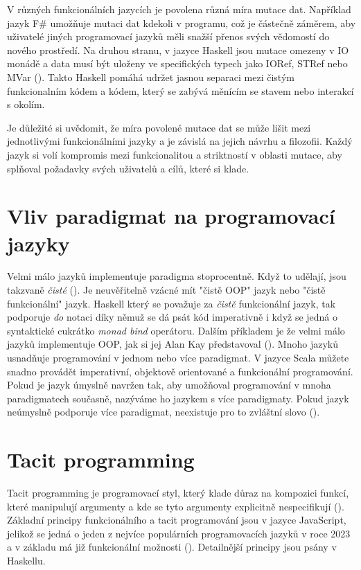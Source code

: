 \documentclass[male,czech]{kithesis}
\begin{document}
V různých funkcionálních jazycích je povolena různá míra mutace dat.
Například jazyk F\# umožňuje mutaci dat kdekoli v programu, 
což je částečně záměrem, 
aby uživatelé jiných programovací jazyků měli snažší přenos svých vědomostí do 
nového prostředí.
Na druhou stranu, 
v jazyce Haskell jsou mutace omezeny v IO monádě a 
data musí být uloženy 
ve specifických typech jako IORef, STRef nebo MVar (\cite{Jones2010}). 
Takto Haskell pomáhá udržet jasnou separaci mezi čistým funkcionalním kódem a kódem, 
který se zabývá měnícím se stavem nebo interakcí s okolím.

Je důležité si uvědomit, 
že míra povolené mutace dat se může lišit mezi jednotlivými funkcionálními jazyky a 
je závislá na jejich návrhu a filozofii. 
Každý jazyk si volí kompromis mezi funkcionalitou a 
striktností v oblasti mutace, 
aby splňoval požadavky svých uživatelů a cílů, 
které si klade.

\section{Vliv paradigmat na programovací jazyky}
Velmi málo jazyků implementuje paradigma stoprocentně. 
Když to udělají, 
jsou takzvaně \textit{čisté} (\cite{ProgrammingParadigms}). 
Je neuvěřitelně vzácné mít "čistě OOP" jazyk nebo 
"čistě funkcionální" jazyk. 
Haskell který se považuje za \textit{čistě} funkcionální jazyk,
tak podporuje \textit{do} notaci díky němuž se dá psát kód imperativně
i když se jedná o syntaktické cukrátko \textit{monad bind} operátoru.
Dalším příkladem je že velmi málo jazyků implementuje OOP, 
jak si jej Alan Kay představoval (\cite{ProgrammingParadigms}).
Mnoho jazyků usnadňuje programování v jednom nebo více paradigmat. 
V jazyce Scala můžete snadno provádět imperativní, 
objektově orientované a funkcionální programování. 
Pokud je jazyk úmyslně navržen tak, 
aby umožňoval programování v mnoha paradigmatech současně, 
nazýváme ho jazykem s více paradigmaty. 
Pokud jazyk neúmyslně podporuje více paradigmat, 
neexistuje pro to zvláštní slovo (\cite{ProgrammingParadigms}).

\section{Tacit programming}

Tacit programming je programovací styl, 
který klade důraz na kompozici funkcí, 
které manipulují argumenty a 
kde se tyto argumenty explicitně nespecifikují (\cite{Barros2005}).
Základní principy funkcionálního a tacit programování jsou v jazyce JavaScript,
jelikož se jedná o jeden z nejvíce populárních programovacích jazyků v roce 2023
a v základu má již funkcionální možnosti (\cite{StackSurvey}).
Detailnější principy jsou psány v Haskellu.
\end{document}

